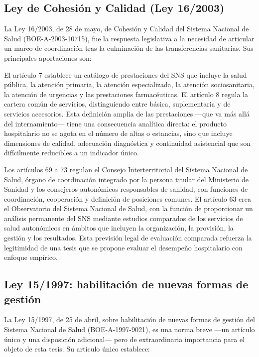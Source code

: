 \subsection{Ley de Cohesión y Calidad (Ley 16/2003)}

La Ley 16/2003, de 28 de mayo, de Cohesión y Calidad del Sistema Nacional de Salud (BOE-A-2003-10715), fue la respuesta legislativa a la necesidad de articular un marco de coordinación tras la culminación de las transferencias sanitarias. Sus principales aportaciones son:

El artículo 7 establece un catálogo de prestaciones del SNS que incluye la salud pública, la atención primaria, la atención especializada, la atención sociosanitaria, la atención de urgencias y las prestaciones farmacéuticas. El artículo 8 regula la cartera común de servicios, distinguiendo entre básica, suplementaria y de servicios accesorios. Esta definición amplia de las prestaciones ---que va más allá del internamiento--- tiene una consecuencia analítica directa: el producto hospitalario no se agota en el número de altas o estancias, sino que incluye dimensiones de calidad, adecuación diagnóstica y continuidad asistencial que son difícilmente reducibles a un indicador único.

Los artículos 69 a 73 regulan el Consejo Interterritorial del Sistema Nacional de Salud, órgano de coordinación integrado por la persona titular del Ministerio de Sanidad y los consejeros autonómicos responsables de sanidad, con funciones de coordinación, cooperación y definición de posiciones comunes. El artículo 63 crea el Observatorio del Sistema Nacional de Salud, con la función de proporcionar un análisis permanente del SNS mediante estudios comparados de los servicios de salud autonómicos en ámbitos que incluyen la organización, la provisión, la gestión y los resultados. Esta previsión legal de evaluación comparada refuerza la legitimidad de una tesis que se propone evaluar el desempeño hospitalario con enfoque empírico.

\subsection{Ley 15/1997: habilitación de nuevas formas de gestión}

La Ley 15/1997, de 25 de abril, sobre habilitación de nuevas formas de gestión del Sistema Nacional de Salud (BOE-A-1997-9021), es una norma breve ---un artículo único y una disposición adicional--- pero de extraordinaria importancia para el objeto de esta tesis. Su artículo único establece:

